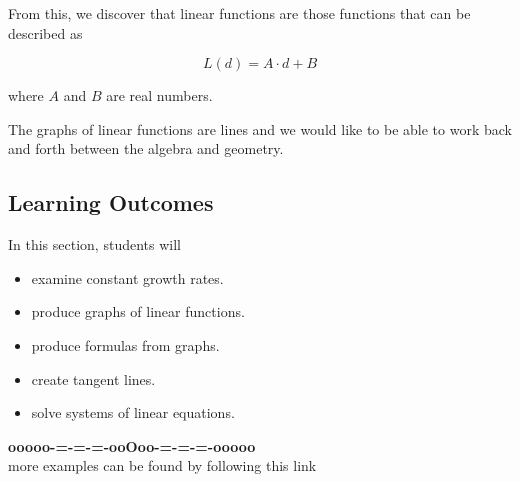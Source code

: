 \documentclass{ximera}
\begin{document}
From this, we discover that linear functions are those functions that can be described as

\[  L(d) = A \cdot d + B \]

where $A$ and $B$ are real numbers.


The graphs of linear functions are lines and we would like to be able to work back and forth between the algebra and geometry.
















\subsection*{Learning Outcomes}



\begin{sectionOutcomes}
In this section, students will 

\begin{itemize}
\item examine constant growth rates.
\item produce graphs of linear functions.
\item produce formulas from graphs.
\item create tangent lines.
\item solve systems of linear equations.
\end{itemize}
\end{sectionOutcomes}




















\begin{onlineOnly}
\begin{center}
\textbf{\textcolor{green!50!black}{ooooo-=-=-=-ooOoo-=-=-=-ooooo}} \\

more examples can be found by following this link\\ 

\end{center}
\end{onlineOnly}
\end{document}
